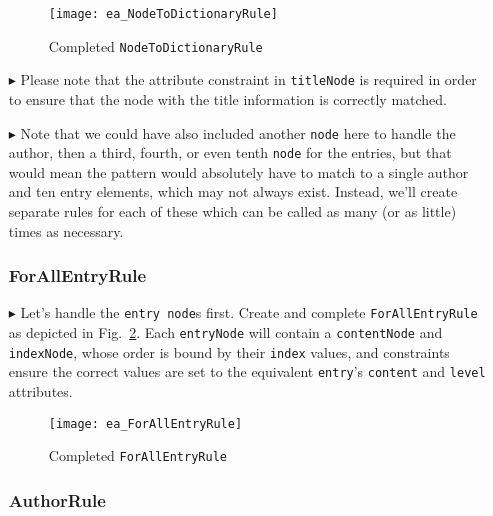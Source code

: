 \begin{itemize}
\begin{figure}[htbp]
  \hspace{-0.7cm}
  \texttt{[image: ea\_NodeToDictionaryRule]}
  \caption{Completed \texttt{NodeToDictionaryRule}}
  \label{ea:NodeToDictionary_Complete}
\end{figure}


\item[$\blacktriangleright$] Please note that the attribute constraint in \texttt{titleNode} is required in order to ensure that the node
with the title information is correctly matched. 

\item[$\blacktriangleright$] Note that we could have also included another \texttt{node} here to handle the author, then a third, fourth, or even tenth
\texttt{node} for the entries, but that would mean the pattern would absolutely have to match to a single author and ten entry elements, which
may not always exist. Instead, we'll create separate rules for each of these which can be called as many (or as little) times as necessary.

\subsubsection{ForAllEntryRule} %

\item[$\blacktriangleright$] Let's handle the \texttt{entry node}s first. Create and complete \texttt{For\-All\-Ent\-ry\-Rule} as depicted in
Fig.~\ref{ea:ForAllEntry_Complete}. Each \texttt{entryNode} will contain a \texttt{contentNode} and \texttt{indexNode}, whose order is bound by their
\texttt{index} values, and constraints ensure the correct values are set to the equivalent \texttt{entry}'s \texttt{content} and \texttt{level} attributes.

\vspace{0.5cm}

\begin{figure}[htbp]
\begin{center}
  \texttt{[image: ea\_ForAllEntryRule]}
  \caption{Completed \texttt{ForAllEntryRule}}
  \label{ea:ForAllEntry_Complete}
\end{center}
\end{figure}

\subsubsection{AuthorRule} %


\end{itemize}
